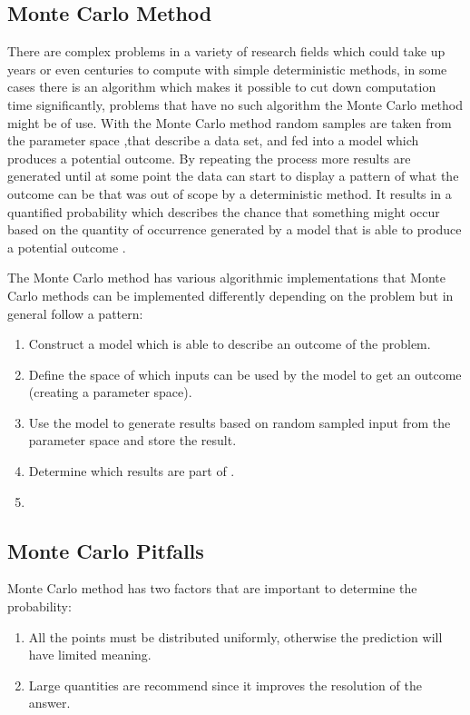 \subsection{Monte Carlo Method}
There are complex problems in a variety of research fields which could take up years or even centuries to compute with simple deterministic methods, in some cases there is an algorithm which makes it possible to cut down computation time significantly,  problems that have no such algorithm the Monte Carlo method might be of use. With the Monte Carlo method random samples are taken from the parameter space ,that describe a data set, and fed into a model which produces a potential outcome. By repeating the process more results are generated until at some point the data can start to display a pattern of what the outcome can be that was out of scope by a deterministic method. It results in a quantified probability which describes the chance that something might occur based on the quantity of occurrence generated by a model that is able to produce a potential outcome \cite{}.

The Monte Carlo method has various algorithmic implementations that 
Monte Carlo methods can be implemented differently depending on the problem but in general follow a pattern:
\begin{enumerate}[1:]
	\item Construct a model which is able to describe an outcome of the problem.
	\item Define the space of which inputs can be used by the model to get an outcome (creating a parameter space). 
	\item Use the model to generate results based on random sampled input from the parameter space and store the result.
	\item Determine which results are part of .
	\item 
\end{enumerate}

\subsection{Monte Carlo Pitfalls}
\label{Subsec:Monte_Carlo_Pitfalls}


Monte Carlo method has two factors that are important to determine the probability:
\begin{enumerate}[1:]
	\item All the points must be distributed uniformly, otherwise the prediction will have limited meaning.
	\item Large quantities are recommend since it improves the resolution of the answer.
\end{enumerate}
